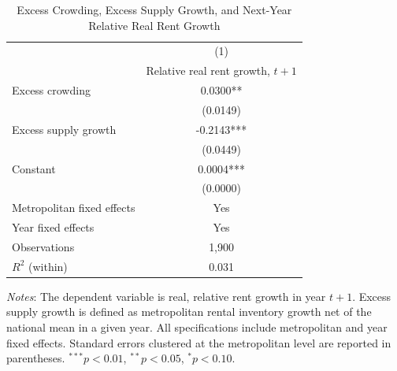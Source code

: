 \begin{table}[!htbp]
\centering
\caption{Excess Crowding, Excess Supply Growth, and Next-Year Relative Real Rent Growth}
\label{tab:excess_supply_spec}
\begin{tabular}{l c}
\hline\hline
 & (1) \\
 & Relative real rent growth, $t+1$ \\
\hline
Excess crowding          & 0.0300** \\
                         & (0.0149) \\
Excess supply growth     & -0.2143*** \\
                         & (0.0449) \\
Constant                 & 0.0004*** \\
                         & (0.0000) \\
\hline
Metropolitan fixed effects & Yes \\
Year fixed effects         & Yes \\
Observations               & 1,900 \\
$R^{2}$ (within)           & 0.031 \\
\hline\hline
\end{tabular}

\begin{flushleft}
\footnotesize
\textit{Notes}: The dependent variable is real, relative rent growth in year $t+1$.
Excess supply growth is defined as metropolitan rental inventory growth net of the
national mean in a given year. All specifications include metropolitan and year fixed
effects. Standard errors clustered at the metropolitan level are reported in parentheses.
$^{***}p<0.01$, $^{**}p<0.05$, $^{*}p<0.10$.
\end{flushleft}
\end{table}
